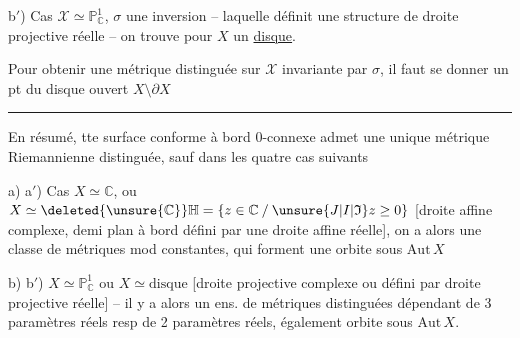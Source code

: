 
b$'$) Cas $\mathscr X\simeq\mathbb P^1_{\mathbb C}$, $\sigma$ une inversion -- laquelle définit une structure de droite projective réelle -- on trouve  pour $X$ un \uline{disque}.

Pour obtenir une métrique distinguée sur $\mathscr X$ invariante par $\sigma$, il faut se donner un pt du disque ouvert $X\setminus\partial X$

\hfill\rule{0.34\linewidth}{0.4pt}\hfill\null

En résumé, tte surface conforme à bord $0$-connexe admet une unique métrique Riemannienne distinguée, sauf dans les quatre cas suivants

a) a$'$) Cas $X\simeq\mathbb C$, ou $X\simeq\deleted{\unsure{\mathbb C}}\mathbb H=\{z\in\mathbb C\mathbin{/}\unsure{J|I|\mathfrak I}z\geq 0\}$ [droite affine complexe, demi plan à bord défini par une droite affine réelle], on a alors une classe de métriques mod constantes, qui forment une orbite sous $\mathrm{Aut}\, X$

b) b$'$) $X\simeq\mathbb P^1_{\mathbb C}$ ou $X\simeq\text{disque}$ [droite projective complexe ou  défini par droite projective réelle] -- il y a alors un ens. de métriques distinguées dépendant de 3 paramètres réels resp de 2 paramètres réels, également orbite sous $\mathrm{Aut}\,X$.

